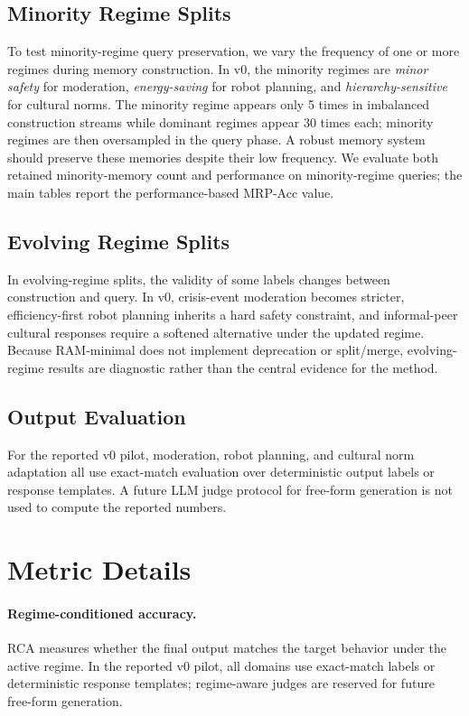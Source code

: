 \documentclass{article} %
\begin{document}
\subsection{Minority Regime Splits}

To test minority-regime query preservation, we vary the frequency of one or more regimes during memory construction.
In v0, the minority regimes are \textit{minor safety} for moderation, \textit{energy-saving} for robot planning, and \textit{hierarchy-sensitive} for cultural norms.
The minority regime appears only 5 times in imbalanced construction streams while dominant regimes appear 30 times each; minority regimes are then oversampled in the query phase.
A robust memory system should preserve these memories despite their low frequency.
We evaluate both retained minority-memory count and performance on minority-regime queries; the main tables report the performance-based MRP-Acc value.

\subsection{Evolving Regime Splits}

In evolving-regime splits, the validity of some labels changes between construction and query.
In v0, crisis-event moderation becomes stricter, efficiency-first robot planning inherits a hard safety constraint, and informal-peer cultural responses require a softened alternative under the updated regime.
Because RAM-minimal does not implement deprecation or split/merge, evolving-regime results are diagnostic rather than the central evidence for the method.

\subsection{Output Evaluation}

For the reported v0 pilot, moderation, robot planning, and cultural norm adaptation all use exact-match evaluation over deterministic output labels or response templates.
A future LLM judge protocol for free-form generation is not used to compute the reported numbers.

\section{Metric Details}
\label{app:metric_details}

\paragraph{Regime-conditioned accuracy.}
RCA measures whether the final output matches the target behavior under the active regime.
In the reported v0 pilot, all domains use exact-match labels or deterministic response templates; regime-aware judges are reserved for future free-form generation.
\end{document}
